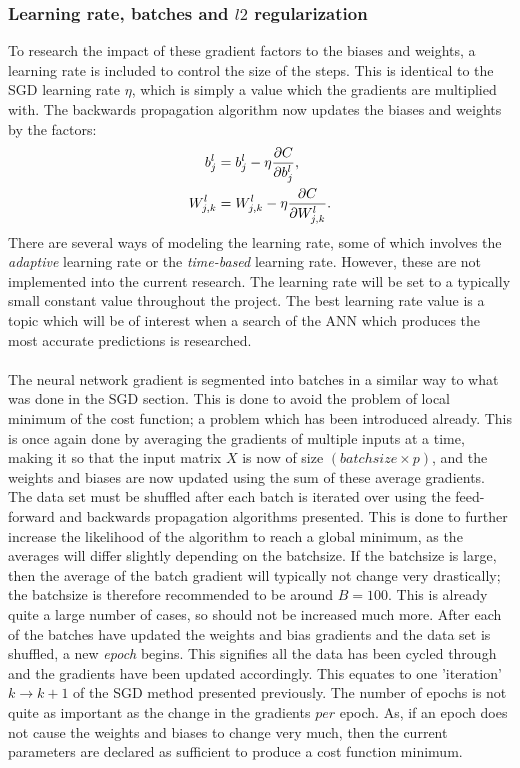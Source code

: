         \subsubsection{Learning rate, batches and $l2$ regularization}
            To research the impact of these gradient factors to the biases and weights, a learning rate is included to control the size of the steps. This is identical to the SGD learning rate $\eta$, which is simply a value which the gradients are multiplied with. The backwards propagation algorithm now updates the biases and weights by the factors:
            \begin{align}
                b^l_j &= b^l_j - \eta \pdv{C}{b^l_j}, \\
                W^l_{j,k} &= W^l_{j,k} - \eta \pdv{C}{W^l_{j,k}}.
            \end{align}
            There are several ways of modeling the learning rate, some of which involves the \textit{adaptive} learning rate or the \textit{time-based} learning rate. However, these are not implemented into the current research. The learning rate will be set to a typically small constant value throughout the project. The best learning rate value is a topic which will be of interest when a search of the ANN which produces the most accurate predictions is researched.\\\\
            The neural network gradient is segmented into batches in a similar way to what was done in the SGD section. This is done to avoid the problem of local minimum of the cost function; a problem which has been introduced already. This is once again done by averaging the gradients of multiple inputs at a time, making it so that the input matrix $X$ is now of size $(batchsize \times p)$, and the weights and biases are now updated using the sum of these average gradients. The data set must be shuffled after each batch is iterated over using the feed-forward and backwards propagation algorithms presented. This is done to further increase the likelihood of the algorithm to reach a global minimum, as the averages will differ slightly depending on the batchsize. If the batchsize is large, then the average of the batch gradient will typically not change very drastically; the batchsize is therefore recommended to be around $B=100$. This is already quite a large number of cases, so should not be increased much more. After each of the batches have updated the weights and bias gradients and the data set is shuffled, a new \textit{epoch} begins. This signifies all the data has been cycled through and the gradients have been updated accordingly. This equates to one 'iteration' $k\rightarrow k+1$ of the SGD method presented previously. The number of epochs is not quite as important as the change in the gradients $per$ epoch. As, if an epoch does not cause the weights and biases to change very much, then the current parameters are declared as sufficient to produce a cost function minimum.\\\\
